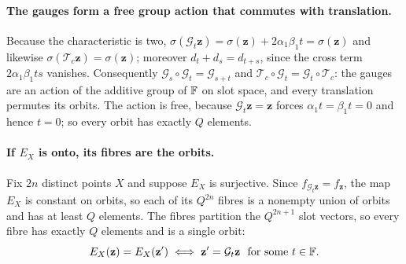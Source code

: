 \paragraph{The gauges form a free group action that commutes with translation.}
Because the characteristic is two,
$\sigma(\mathcal G_t\mathbf z)=\sigma(\mathbf z)+2\alpha_1\beta_1t=\sigma(\mathbf z)$ and
likewise $\sigma(\mathcal T_c\mathbf z)=\sigma(\mathbf z)$; moreover
$d_t+d_s=d_{t+s}$, since the cross term $2\alpha_1\beta_1ts$ vanishes.  Consequently
$\mathcal G_s\circ\mathcal G_t=\mathcal G_{s+t}$ and
$\mathcal T_c\circ\mathcal G_t=\mathcal G_t\circ\mathcal T_c$: the gauges are an action of
the additive group of $\mathbb{F}$ on slot space, and every translation permutes its orbits.  The
action is free, because $\mathcal G_t\mathbf z=\mathbf z$ forces
$\alpha_1t=\beta_1t=0$ and hence $t=0$; so every orbit has exactly $Q$ elements.

\paragraph{If $E_X$ is onto, its fibres are the orbits.}
Fix $2n$ distinct points $X$ and suppose $E_X$ is surjective.  Since
$f_{\mathcal G_t\mathbf z}=f_{\mathbf z}$, the map $E_X$ is constant on orbits, so each of
its $Q^{2n}$ fibres is a nonempty union of orbits and has at least $Q$ elements.  The
fibres partition the $Q^{2n+1}$ slot vectors, so every fibre has exactly $Q$ elements and
is a single orbit:
\begin{equation}
   E_X(\mathbf z)=E_X(\mathbf z')
   \iff
   \mathbf z'=\mathcal G_t\mathbf z\ \text{ for some } t\in\mathbb{F} .
   \label{eq:char2-fibres}
\end{equation}

